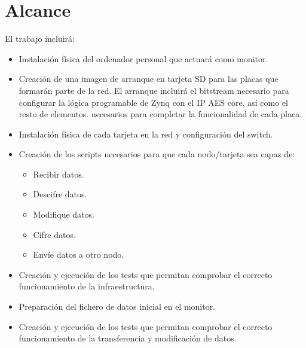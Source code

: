 \section{Alcance}
El trabajo incluirá:
\begin{itemize}
	\item Instalación física del ordenador personal que actuará como monitor.
	\item Creación de una imagen de arranque en tarjeta SD para las placas que formarán parte de la red. El arranque incluirá el bitstream necesario para configurar la lógica programable de Zynq con el IP AES core, así como el resto de elementos.
	necesarios para completar la funcionalidad de cada placa.
	\item Instalación física de cada tarjeta en la red y configuración del switch.
	\item Creación de los scripts necesarios para que cada nodo/tarjeta sea capaz de:
	\begin{itemize}
		\item Recibir datos.
		\item Descifre datos.
		\item Modifique datos.
		\item Cifre datos.
		\item Envíe datos a otro nodo.
	\end{itemize}
	\item Creación y ejecución de los tests que permitan comprobar el correcto funcionamiento de la infraestructura.
	\item Preparación del fichero de datos inicial en el monitor.
	\item Creación y ejecución de los tests que permitan comprobar el correcto funcionamiento de la transferencia y modificación de datos.
\end{itemize}